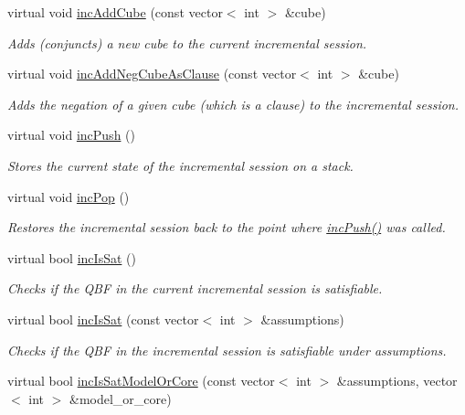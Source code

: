 \begin{DoxyCompactItemize}
virtual void \hyperlink{classDepQBFApi_a97e3e631830a5fcdf351ae4bfbb336c5}{inc\-Add\-Cube} (const vector$<$ int $>$ \&cube)
\begin{DoxyCompactList}\small\item\em Adds (conjuncts) a new cube to the current incremental session. \end{DoxyCompactList}\item 
virtual void \hyperlink{classDepQBFApi_ad519a83a3e70e0224329f9e4a534a01f}{inc\-Add\-Neg\-Cube\-As\-Clause} (const vector$<$ int $>$ \&cube)
\begin{DoxyCompactList}\small\item\em Adds the negation of a given cube (which is a clause) to the incremental session. \end{DoxyCompactList}\item 
virtual void \hyperlink{classDepQBFApi_abb9f9d11ceb7f5528efd374a4fb3a7e9}{inc\-Push} ()
\begin{DoxyCompactList}\small\item\em Stores the current state of the incremental session on a stack. \end{DoxyCompactList}\item 
virtual void \hyperlink{classDepQBFApi_ac70d54cdcd3be4bc80dc84dd14e4a8c1}{inc\-Pop} ()
\begin{DoxyCompactList}\small\item\em Restores the incremental session back to the point where \hyperlink{classDepQBFApi_abb9f9d11ceb7f5528efd374a4fb3a7e9}{inc\-Push()} was called. \end{DoxyCompactList}\item 
virtual bool \hyperlink{classDepQBFApi_a8687c635b0d7f6413baca131ae9628ca}{inc\-Is\-Sat} ()
\begin{DoxyCompactList}\small\item\em Checks if the Q\-B\-F in the current incremental session is satisfiable. \end{DoxyCompactList}\item 
virtual bool \hyperlink{classDepQBFApi_a9dc678ea88f60ea0d69bddeb47f56f80}{inc\-Is\-Sat} (const vector$<$ int $>$ \&assumptions)
\begin{DoxyCompactList}\small\item\em Checks if the Q\-B\-F in the incremental session is satisfiable under assumptions. \end{DoxyCompactList}\item 
virtual bool \hyperlink{classDepQBFApi_ab2129624aca73b877c16a5fc7b17f95f}{inc\-Is\-Sat\-Model\-Or\-Core} (const vector$<$ int $>$ \&assumptions, vector$<$ int $>$ \&model\-\_\-or\-\_\-core)

\end{DoxyCompactItemize}
